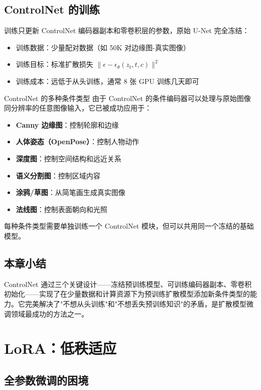 \documentclass[a4paper]{article}
\begin{document}
\subsection{ControlNet 的训练}

训练只更新 ControlNet 编码器副本和零卷积层的参数，原始 U-Net 完全冻结：

\begin{itemize}
    \item 训练数据：少量配对数据（如 50K 对边缘图-真实图像）
    \item 训练目标：标准扩散损失 $\|\epsilon - \epsilon_\theta(z_t, t, c)\|^2$
    \item 训练成本：远低于从头训练，通常 8 张 GPU 训练几天即可
\end{itemize}

\begin{knowledgebox}{ControlNet 的多种条件类型}
由于 ControlNet 的条件编码器可以处理与原始图像同分辨率的任意图像输入，它已被成功应用于：
\begin{itemize}
    \item \textbf{Canny 边缘图}：控制轮廓和边缘
    \item \textbf{人体姿态（OpenPose）}：控制人物动作
    \item \textbf{深度图}：控制空间结构和远近关系
    \item \textbf{语义分割图}：控制区域内容
    \item \textbf{涂鸦/草图}：从简笔画生成真实图像
    \item \textbf{法线图}：控制表面朝向和光照
\end{itemize}
每种条件类型需要单独训练一个 ControlNet 模块，但可以共用同一个冻结的基础模型。
\end{knowledgebox}

\subsection{本章小结}

ControlNet 通过三个关键设计——冻结预训练模型、可训练编码器副本、零卷积初始化——实现了在少量数据和计算资源下为预训练扩散模型添加新条件类型的能力。它完美解决了"不想从头训练"和"不想丢失预训练知识"的矛盾，是扩散模型微调领域最成功的方法之一。

\newpage
\section{LoRA：低秩适应}

\subsection{全参数微调的困境}
\end{document}
